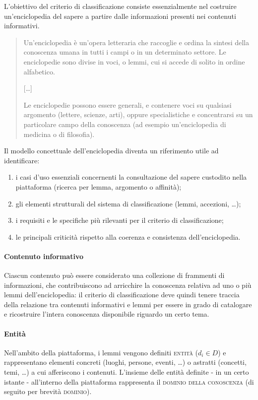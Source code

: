 L'obiettivo del criterio di classificazione consiste essenzialmente nel costruire un'enciclopedia del sapere a partire dalle informazioni presenti nei contenuti informativi.

\begin{quotation}
Un'enciclopedia è un'opera letteraria che raccoglie e ordina la sintesi della conoscenza umana in tutti i campi o in un determinato settore. Le enciclopedie sono divise in voci, o lemmi, cui si accede di solito in ordine alfabetico.
\begin{center}[\ldots]\end{center}
Le enciclopedie possono essere generali, e contenere voci su qualsiasi argomento (lettere, scienze, arti), oppure specialistiche e concentrarsi su un particolare campo della conoscenza (ad esempio un'enciclopedia di medicina o di filosofia). \cite{wiki:enciclopedia}
\end{quotation}

Il modello concettuale dell'enciclopedia diventa un riferimento utile ad identificare:
\begin{enumerate}
	\item i casi d'uso essenziali concernenti la consultazione del sapere custodito nella piattaforma (ricerca per lemma, argomento o affinità);
	\item gli elementi strutturali del sistema di classificazione (lemmi, accezioni, \ldots);
	\item i requisiti e le specifiche più rilevanti per il criterio di classificazione;
	\item le principali criticità rispetto alla coerenza e consistenza dell'enciclopedia.
\end{enumerate}

\paragraph{Contenuto informativo}
Ciascun contenuto può essere considerato una collezione di frammenti di informazioni, che contribuiscono ad arricchire la conoscenza relativa ad uno o più lemmi dell'enciclopedia: il criterio di classificazione deve quindi tenere traccia della relazione tra contenuti informativi e lemmi per essere in grado di catalogare e ricostruire l'intera conoscenza disponibile riguardo un certo tema.

\paragraph{Entità}
Nell'ambito della piattaforma, i lemmi vengono definiti \textsc{entità} ($d_i \in D$) e rappresentano elementi concreti (luoghi, persone, eventi, \ldots) o astratti (concetti, temi, \ldots) a cui afferiscono i contenuti. L'insieme delle entità definite - in un certo istante - all'interno della piattaforma rappresenta il \textsc{dominio della conoscenza} (di seguito per brevità \textsc{dominio}).

